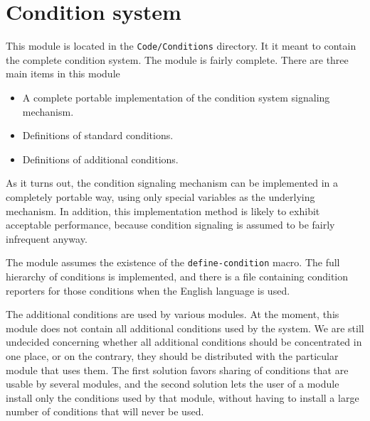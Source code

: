 \chapter{Condition system}

This module is located in the \texttt{Code/Conditions} directory.  It
it meant to contain the complete \cl{} condition system.  The module
is fairly complete.  There are three main items in this module

\begin{itemize}
\item A complete portable implementation of the \cl{} condition
  system signaling mechanism.
\item Definitions of standard \cl{} conditions.
\item Definitions of additional \sysname{} conditions.
\end{itemize}

As it turns out, the \cl{} condition signaling mechanism can be
implemented in a completely portable way, using only special variables
as the underlying mechanism.  In addition, this implementation method
is likely to exhibit acceptable performance, because condition
signaling is assumed to be fairly infrequent anyway.  

The module assumes the existence of the \texttt{define-condition}
macro.  The full hierarchy of \cl{} conditions is implemented, and
there is a file containing condition reporters for those conditions
when the English language is used.

The additional conditions are used by various \sysname{} modules.
At the moment, this module does not contain all additional conditions
used by the system.  We are still undecided concerning whether all
additional conditions should be concentrated in one place, or on the
contrary, they should be distributed with the particular module that
uses them.  The first solution favors sharing of conditions that are
usable by several modules, and the second solution lets the user of a
module install only the conditions used by that module, without having
to install a large number of conditions that will never be used.
